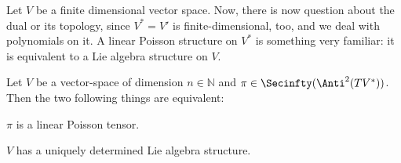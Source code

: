Let $V$ be a finite dimensional vector space. Now, there is now question 
about the dual or its topology, since $V^* = V'$ is finite-dimensional, too, 
and we deal with polynomials on it. A linear Poisson structure on $V^*$ is 
something very familiar: it is equivalent to a Lie algebra structure on $V$.
\begin{proposition}
	\label{Alg:Prop:LinPoissonIsLieAlg}
	Let $V$ be a vector-space of dimension $n \in \mathbb{N}$ and $\pi \in 
	\Secinfty(\Anti^2(TV^*))$. Then the two following things are 
	equivalent:
	\begin{propositionlist}
		\item
		$\pi$ is a linear Poisson tensor.
		
		\item
		$V$ has a uniquely determined Lie algebra structure.
	\end{propositionlist}
\end{proposition}
